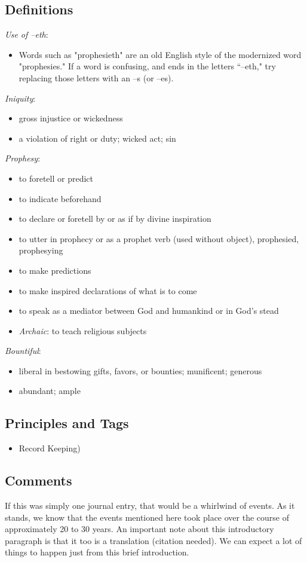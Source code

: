 \documentclass[12pt]{report}
\begin{document}
\subsection{Definitions\label{1Nephi:DFN_intro}}
\emph{Use of --eth}: \begin{itemize}
\item Words such as "prophesieth" are an old English style of the modernized word "prophesies."  If a word is confusing, and ends in the letters ``--eth," try replacing those letters with an --s (or --es).
\end{itemize}
\emph{Iniquity}: \begin{itemize}
\item gross injustice or wickedness
\item a violation of right or duty; wicked act; sin
\end{itemize}
\emph{Prophesy}: \begin{itemize}
\item to foretell or predict
\item to indicate beforehand
\item to declare or foretell by or as if by divine inspiration
\item to utter in prophecy or as a prophet
verb (used without object), prophesied, prophesying
\item to make predictions
\item to make inspired declarations of what is to come
\item to speak as a mediator between God and humankind or in God's stead
\item \emph{Archaic}: to teach religious subjects
\end{itemize}
\emph{Bountiful}: \begin{itemize}
\item liberal in bestowing gifts, favors, or bounties; munificent; generous
\item abundant; ample
\end{itemize}

\subsection{Principles and Tags\label{1Nephi:principles_intro}}
\begin{itemize}
\item {}Record Keeping)
\end{itemize}

\subsection{Comments\label{1Nephi:comments_intro}}
If this was simply one journal entry, that would be a whirlwind of events.  As it stands, we know that the events mentioned here took place over the course of approximately 20 to 30 years.  An important note about this introductory paragraph is that it too is a translation (citation needed).  We can expect a lot of things to happen just from this brief introduction.  
\end{document}
